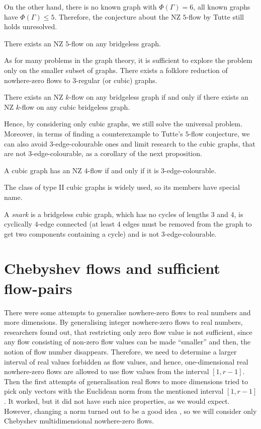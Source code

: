 On the other hand, there is no known graph with $\Phi(\Gamma)=6$, all known graphs have $\Phi(\Gamma)\leq 5$. Therefore, the conjecture about the NZ $5$-flow by Tutte still holds unresolved.

\begin{conjecture} \emph{\cite[p. 83]{tutte}}
    There exists an NZ $5$-flow on any bridgeless graph.\label{conj:5_flow}
\end{conjecture}

As for many problems in the graph theory, it is sufficient to explore the problem only on the smaller subset of graphs. There exists a folklore reduction of nowhere-zero flows to $3$-regular (or cubic) graphs.
\begin{proposition}
    There exists an NZ $k$-flow on any bridgeless graph if and only if there exists an NZ $k$-flow on any cubic bridgeless graph.\label{prop:reduction}
\end{proposition}

Hence, by considering only cubic graphs, we still solve the universal problem. Moreover, in terms of finding a counterexample to Tutte's $5$-flow conjecture, we can also avoid $3$-edge-colourable ones and limit research to the cubic graphs, that are not $3$-edge-colourable, as a corollary of the next proposition.

\begin{proposition} \emph{\cite[pp. 160, 161]{diestel}}
    A cubic graph has an NZ $4$-flow if and only if it is $3$-edge-colourable.
\end{proposition}

The class of type II cubic graphs is widely used, so its members have special name.
\begin{definition}
    A \emph{snark} is a bridgeless cubic graph, which has no cycles of lengths $3$ and $4$, is cyclically $4$-edge connected (at least $4$ edges must be removed from the graph to get two components containing a cycle) and is not $3$-edge-colourable.
\end{definition}

\section{Chebyshev flows and sufficient flow-pairs}

There were some attempts to generalise nowhere-zero flows to real numbers and more dimensions. By generalising integer nowhere-zero flows to real numbers, researchers found out, that restricting only zero flow value is not sufficient, since any flow consisting of non-zero flow values can be made ``smaller'' and then, the notion of flow number disappears. Therefore, we need to determine a larger interval of real values forbidden as flow values, and hence, one-dimensional real nowhere-zero flows are allowed to use flow values from the interval $[1,r-1]$. Then the first attempts of generalisation real flows to more dimensions \cite{TODO} tried to pick only vectors with the Euclidean norm from the mentioned interval $[1,r-1]$. It worked, but it did not have such nice properties, as we would expect. However, changing a norm turned out to be a good idea \cite{svk}, so we will consider only Chebyshev multidimensional nowhere-zero flows. 

